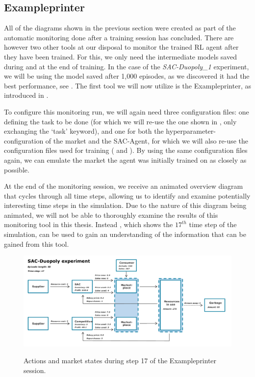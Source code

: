 \subsection{Exampleprinter}

All of the diagrams shown in the previous section were created as part of the automatic monitoring done after a training session has concluded. There are however two other tools at our disposal to monitor the trained RL agent after they have been trained. For this, we only need the intermediate models saved during and at the end of training. In the case of the \emph{SAC-Duopoly\_1} experiment, we will be using the model saved after 1,000 episodes, as we discovered it had the best performance, see . The first tool we will now utilize is the Exampleprinter, as introduced in .

To configure this monitoring run, we will again need three configuration files: one defining the task to be done (for which we will re-use the one shown in , only exchanging the `task' keyword), and one for both the hyperparameter-configuration of the market and the SAC-Agent, for which we will also re-use the configuration files used for training ( and ). By using the same configuration files again, we can emulate the market the agent was initially trained on as closely as possible.

At the end of the monitoring session, we receive an animated overview diagram that cycles through all time steps, allowing us to identify and examine potentially interesting time steps in the simulation. Due to the nature of this diagram being animated, we will not be able to thoroughly examine the results of this monitoring tool in this thesis. Instead , which shows the $17^{th}$ time step of the simulation, can be used to gain an understanding of the information that can be gained from this tool.

\begin{figure}[t]
	\centering
	\includegraphics[width = \textwidth]{images/experiments/SACDuopoly/exampleprinter/ExampleprinterStep17.pdf}\\
	\caption{Actions and market states during step 17 of the Exampleprinter session.}\label{fig:SACDuopolyExampleprinter17}
\end{figure}

